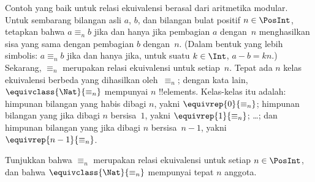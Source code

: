 \documentclass[../../../include/open-logic-section]{subfiles}
\begin{document}
\begin{ex}
Contoh yang baik untuk relasi ekuivalensi berasal dari aritmetika modular.
Untuk sembarang bilangan asli $a$, $b$, dan bilangan bulat positif
$n \in \PosInt$, tetapkan bahwa $a \equiv_n b$
jika dan hanya jika pembagian $a$ dengan~$n$ menghasilkan sisa yang sama
dengan pembagian $b$ dengan~$n$. (Dalam bentuk yang lebih simbolis:
$a \equiv_n b$ jika dan hanya jika, untuk suatu $k \in \Int$, $a - b = kn$.)
Sekarang, $\equiv_n$ merupakan relasi ekuivalensi untuk setiap~$n$. Tepat ada
$n$ kelas ekuivalensi berbeda yang dihasilkan oleh~$\equiv_n$; dengan kata
lain, $\equivclass{\Nat}{\equiv_n}$ mempunyai $n$ !!{element}s. Kelas-kelas
itu adalah: himpunan bilangan yang habis dibagi $n$, yakni
$\equivrep{0}{\equiv_n}$; himpunan bilangan yang jika dibagi $n$ bersisa~$1$,
yakni $\equivrep{1}{\equiv_n}$; \ldots; dan himpunan bilangan yang jika dibagi
$n$ bersisa~$n-1$, yakni~$\equivrep{n-1}{\equiv_n}$.
\end{ex}

\begin{prob}
Tunjukkan bahwa $\equiv_n$ merupakan relasi ekuivalensi untuk setiap $n \in
\PosInt$, dan bahwa $\equivclass{\Nat}{\equiv_n}$ mempunyai tepat $n$ anggota.
\end{prob}
\end{document}
